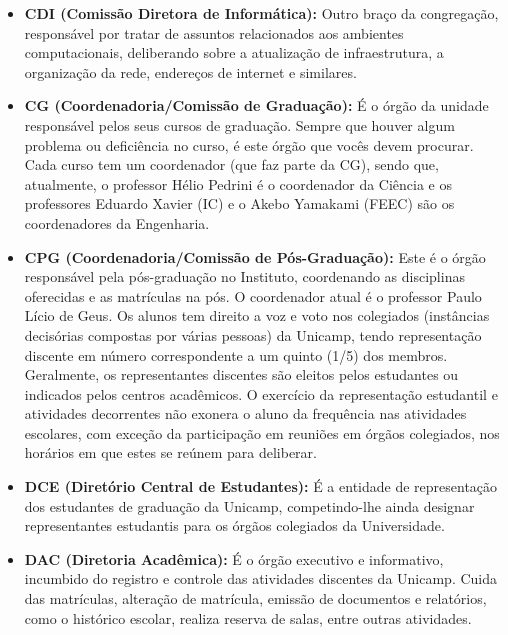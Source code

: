 \begin{itemize}
    \item  \textbf{CDI (Comissão Diretora de Informática):} Outro braço da
    congregação, responsável por tratar de assuntos relacionados aos ambientes
    computacionais, deliberando sobre a atualização de infraestrutura,
    a organização da rede, endereços de internet e similares.

    \item  \textbf{CG (Coordenadoria/Comissão de Graduação):} É o órgão da
    unidade responsável pelos seus cursos de graduação. Sempre que houver algum
    problema ou deficiência no curso, é este órgão que vocês devem procurar.
    Cada curso tem um coordenador (que faz parte da CG), sendo que, atualmente,
    o professor Hélio Pedrini é o coordenador da Ciência e os professores
    Eduardo Xavier (IC) e o Akebo Yamakami (FEEC) são os coordenadores da
    Engenharia.

    \item  \textbf{CPG (Coordenadoria/Comissão de Pós-Graduação):} Este
    é o órgão responsável pela pós-graduação no Instituto, coordenando as
    disciplinas oferecidas e as matrículas na pós. O coordenador atual
    é o professor Paulo Lício de Geus. Os alunos tem direito a voz e voto nos
    colegiados (instâncias decisórias compostas por várias pessoas) da Unicamp,
    tendo representação discente em número correspondente a um quinto (1/5) dos
    membros. Geralmente, os representantes discentes são eleitos pelos
    estudantes ou indicados pelos centros acadêmicos. O exercício da
    representação estudantil e atividades decorrentes não exonera o aluno da
    frequência nas atividades escolares, com exceção da participação em reuniões
    em órgãos colegiados, nos horários em que estes se reúnem para deliberar.

    \item  \textbf{DCE (Diretório Central de Estudantes):} É a entidade de
    representação dos estudantes de graduação da Unicamp, competindo-lhe ainda
    designar representantes estudantis para os órgãos colegiados da
    Universidade.

    \item  \textbf{DAC (Diretoria Acadêmica):} É o órgão executivo
    e informativo, incumbido do registro e controle das atividades discentes da
    Unicamp. Cuida das matrículas, alteração de matrícula, emissão de documentos
    e relatórios, como o histórico escolar, realiza reserva de salas, entre
    outras atividades.


\end{itemize}
